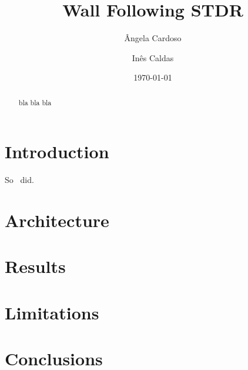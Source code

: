 \documentclass[12pt,a4paper,reqno]{article}
\numberwithin{figure}{section}
\numberwithin{equation}{section}
\begin{document}
\title{Wall Following STDR}

\author{\^{A}ngela Cardoso}
\author{In\^{e}s Caldas}
\date{\today}

\maketitle

\begin{abstract}
bla bla bla
\end{abstract}

\tableofcontents

\section{Introduction}

So~\cite{Trahtman:2009} did.


\section{Architecture}

\section{Results}

\section{Limitations}

\section{Conclusions}



\end{document}
